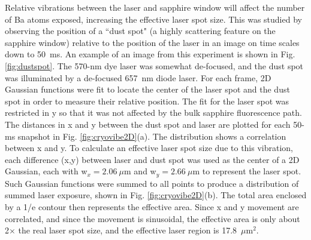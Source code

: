 Relative vibrations between the laser and sapphire window will affect the number of Ba atoms exposed, increasing the effective laser spot size.  This was studied by observing the position of a ``dust spot" (a highly scattering feature on the sapphire window) relative to the position of the laser in an image on time scales down to 50~ms.  An example of an image from this experiment is shown in Fig. \ref{fig:dustspot}.  The 570-nm dye laser was somewhat de-focused, and the dust spot was illuminated by a de-focused 657~nm diode laser. For each frame, 2D Gaussian functions were fit to locate the center of the laser spot and the dust spot in order to measure their relative position.  The fit for the laser spot was restricted in y so that it was not affected by the bulk sapphire fluorescence path.  The distances in x and y between the dust spot and laser are plotted for each 50-ms snapshot in Fig. \ref{fig:cryovibe2D}(a).  The distribution shows a correlation between x and y.  To calculate an effective laser spot size due to this vibration, each difference (x,y) between laser and dust spot was used as the center of a 2D Gaussian, each with w$_{x} = 2.06~\mu$m and w$_{y} = 2.66~\mu$m to represent the laser spot.  Such Gaussian functions were summed to all points to produce a distribution of summed laser exposure, shown in Fig. \ref{fig:cryovibe2D}{\color{red}(b)}.  The total area enclosed by a 1/e contour then represents the effective area.  Since x and y movement are correlated, and since the movement is sinusoidal, the effective area is only about 2$\times$ the real laser spot size, and the effective laser region is 17.8~$\mu$m$^{2}$.


